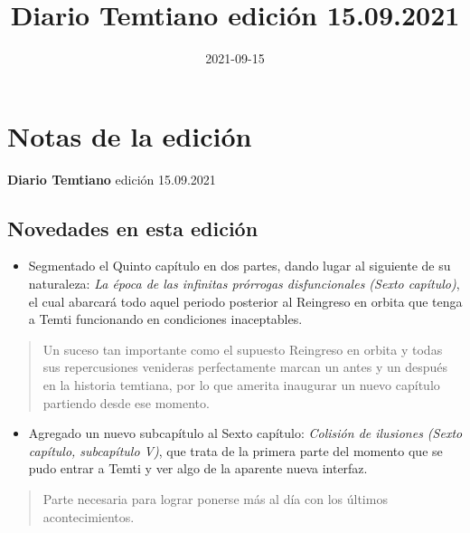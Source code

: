 \documentclass[
  spanish,
]{book}
\title{Diario Temtiano edición 15.09.2021}
\author{}
\date{\vspace{-2.5em}2021-09-15}
\providecommand{\tightlist}{%
  \setlength{\itemsep}{0pt}\setlength{\parskip}{0pt}}
\begin{document}
\maketitle

{
\setcounter{tocdepth}{1}
\tableofcontents
}
\hypertarget{notas-de-la-ediciuxf3n}{%
\chapter*{Notas de la edición}\label{notas-de-la-ediciuxf3n}}

\textbf{Diario Temtiano} edición 15.09.2021

\hypertarget{novedades-en-esta-ediciuxf3n}{%
\section*{Novedades en esta edición}\label{novedades-en-esta-ediciuxf3n}}

\begin{itemize}
\tightlist
\item
  Segmentado el Quinto capítulo en dos partes, dando lugar al siguiente de su naturaleza: \emph{La época de las infinitas prórrogas disfuncionales (Sexto capítulo)}, el cual abarcará todo aquel periodo posterior al Reingreso en orbita que tenga a Temti funcionando en condiciones inaceptables.
\end{itemize}

\begin{quote}
Un suceso tan importante como el supuesto Reingreso en orbita y todas sus repercusiones venideras perfectamente marcan un antes y un después en la historia temtiana, por lo que amerita inaugurar un nuevo capítulo partiendo desde ese momento.
\end{quote}

\begin{itemize}
\tightlist
\item
  Agregado un nuevo subcapítulo al Sexto capítulo: \emph{Colisión de ilusiones (Sexto capítulo, subcapítulo V)}, que trata de la primera parte del momento que se pudo entrar a Temti y ver algo de la aparente nueva interfaz.
\end{itemize}

\begin{quote}
Parte necesaria para lograr ponerse más al día con los últimos acontecimientos.
\end{quote}
\end{document}
